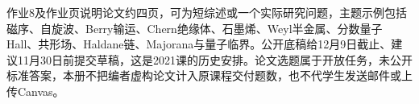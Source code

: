 作业8及作业页说明论文约四页，可为短综述或一个实际研究问题，主题示例包括磁序、自旋波、Berry输运、Chern绝缘体、石墨烯、Weyl半金属、分数量子Hall、共形场、Haldane链、Majorana与量子临界。公开底稿给12月9日截止、建议11月30日前提交草稿，这是2021课的历史安排。论文选题属于开放任务，未公开标准答案，本册不把编者虚构论文计入原课程交付题数，也不代学生发送邮件或上传Canvas。
